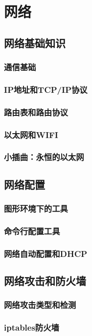 \documentclass[amstex,twoside]{ctexbook}
\begin{document}
\chapter{网络}\label{chap:network}
\section{网络基础知识}
\subsection{通信基础}
\subsection{IP地址和TCP/IP协议}
\subsection{路由表和路由协议}
\subsection{以太网和WIFI}
\subsection*{小插曲：永恒的以太网}

\section{网络配置\label{sec:ifconfig}}
\subsection{图形环境下的工具	}
\subsection{命令行配置工具}
\subsection{网络自动配置和DHCP}
\section{网络攻击和防火墙	}
\subsection{网络攻击类型和检测}
\subsection{iptables防火墙}
\end{document}
